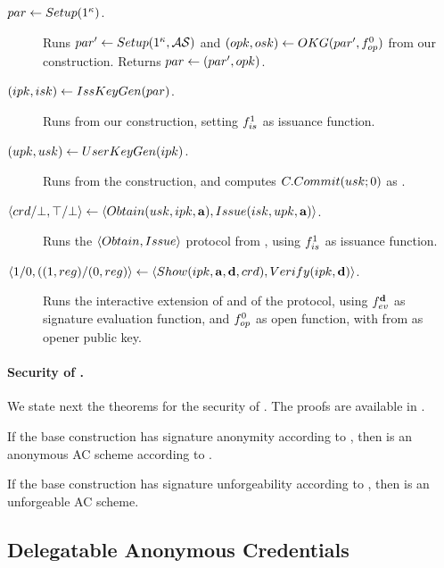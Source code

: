 \begin{description}
\item[$par \gets Setup(1^\kappa)$.] Runs $par' \gets Setup(1^\kappa,
  \mathcal{AS})$ and $(opk,osk) \gets OKG(par',f_{op}^0)$ from our
  \CUASGen construction. Returns $par \gets (par',opk)$.
\item[$(ipk,isk) \gets IssKeyGen(par)$.] Runs \IKeyGen from our
  \CUASGen construction, setting $f_{is}^1$ as issuance function.
\item[$(upk,usk) \gets UserKeyGen(ipk)$.] Runs \UKeyGen from the
  \CUASGen construction, and computes $C.Commit(usk;0)$ as \upk.
\item[$\langle crd/\bot,\top/\bot \rangle \gets
  \langle Obtain(usk,ipk,\mathbf{a}),Issue(isk,upk,\mathbf{a}) \rangle$.]
  Runs the $\langle Obtain,Issue \rangle$ protocol from \CUASGen, using
  $f_{is}^1$ as issuance function.
\item[$\langle 1/0,((1,reg)/(0,reg)\rangle
  \gets \langle Show(ipk,\mathbf{a},\mathbf{d},
  crd),Verify(ipk,\mathbf{d}) \rangle$.]
  Runs the interactive extension of \Sign and \Verify of the \CUASGen protocol,
  using $f_{ev}^{\mathbf{d}}$ as signature evaluation function, and $f_{op}^0$ as
  open function, with \opk from \parm as opener public key.
\end{description}

\paragraph{Security of \CUASAC.} %
We state next the theorems for the security of \CUASAC. The proofs are
available in .

\begin{theorem}
  \label{thm:anon-cuasac}
  If the base \CUASGen construction has signature anonymity according to
  , then \CUASAC is an anonymous AC scheme
  according to \cite{fhs19}.
\end{theorem}

\begin{theorem}
  \label{thm:forge-cuasac}
  If the base \CUASGen construction has signature unforgeability according to
  , then \CUASAC is an unforgeable AC scheme.
\end{theorem}

\subsection{Delegatable Anonymous Credentials}
\label{ssec:related-models-dac}

